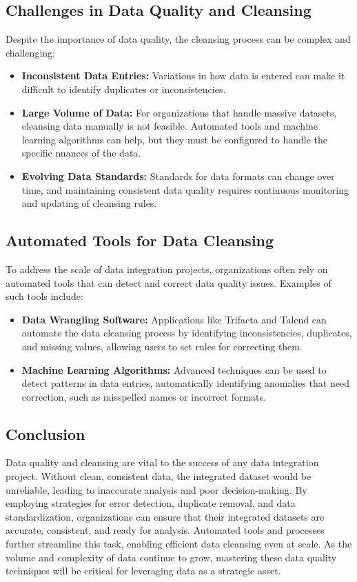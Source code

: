 \documentclass[12pt]{article}
\begin{document}
\subsection{Challenges in Data Quality and Cleansing}
Despite the importance of data quality, the cleansing process can be complex and challenging:

\begin{itemize}
    \item \textbf{Inconsistent Data Entries:} Variations in how data is entered can make it difficult to identify duplicates or inconsistencies.
    \item \textbf{Large Volume of Data:} For organizations that handle massive datasets, cleansing data manually is not feasible. Automated tools and machine learning algorithms can help, but they must be configured to handle the specific nuances of the data.
    \item \textbf{Evolving Data Standards:} Standards for data formats can change over time, and maintaining consistent data quality requires continuous monitoring and updating of cleansing rules.
\end{itemize}

\subsection{Automated Tools for Data Cleansing}
To address the scale of data integration projects, organizations often rely on automated tools that can detect and correct data quality issues. Examples of such tools include:

\begin{itemize}
    \item \textbf{Data Wrangling Software:} Applications like Trifacta and Talend can automate the data cleansing process by identifying inconsistencies, duplicates, and missing values, allowing users to set rules for correcting them.
    \item \textbf{Machine Learning Algorithms:} Advanced techniques can be used to detect patterns in data entries, automatically identifying anomalies that need correction, such as misspelled names or incorrect formats.
\end{itemize}

\subsection{Conclusion}
Data quality and cleansing are vital to the success of any data integration project. Without clean, consistent data, the integrated dataset would be unreliable, leading to inaccurate analysis and poor decision-making. By employing strategies for error detection, duplicate removal, and data standardization, organizations can ensure that their integrated datasets are accurate, consistent, and ready for analysis. Automated tools and processes further streamline this task, enabling efficient data cleansing even at scale. As the volume and complexity of data continue to grow, mastering these data quality techniques will be critical for leveraging data as a strategic asset.
\end{document}
